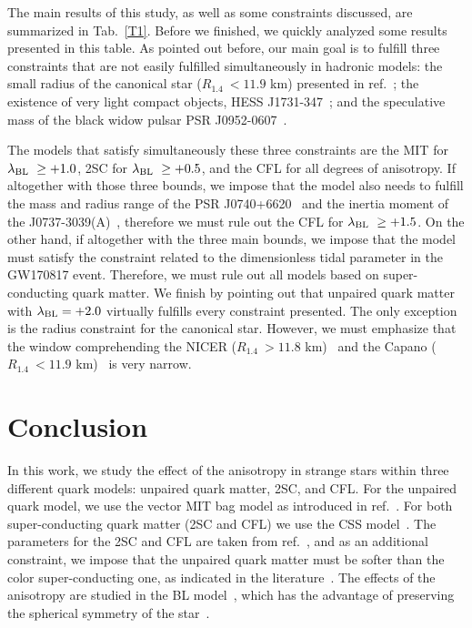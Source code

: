 \documentclass[%
reprint,
superscriptaddress,
nofootinbib,
amsmath,
amssymb,
aps,
floatfix,
showkeys,
]{revtex4-2}
\begin{document}
The main results of this study, as well as some constraints discussed, are summarized in Tab.~\ref{T1}.
Before we finished, we quickly analyzed some results presented in this table. As pointed out before, our main goal is to fulfill three constraints that are not easily fulfilled simultaneously in hadronic models: the small radius of the canonical star ($R_{1.4}~< 11.9$ km) presented in ref.~\cite{Capano_2020}; the existence of very light compact objects, HESS J1731-347~\cite{Doroshenko_2022}; and the speculative mass of the black widow pulsar PSR J0952-0607~\cite{Romani_2022}.

The models that satisfy simultaneously these three constraints are the MIT for $\lambda_{\rm BL}~\geq +1.0$, 2SC for $\lambda_{\rm BL}~\geq +0.5$, and the CFL for all degrees of anisotropy. If altogether with those three bounds, we impose that the model also needs to fulfill the mass and radius range of the PSR J0740+6620~\cite{Miller_2021} and the inertia moment of the J0737-3039(A)~\cite{Landry_2018}, therefore we must rule out the CFL for $\lambda_{\rm BL}~\geq +1.5$.
On the other hand, if altogether with the three main bounds, we impose that the model must satisfy the constraint related to the dimensionless tidal parameter in the GW170817 event. Therefore, we must rule out all models based on super-conducting quark matter. We finish by pointing out that unpaired quark matter with $\lambda_{\rm BL} = +2.0$ virtually fulfills every constraint presented. The only exception is the radius constraint for the canonical star. However, we must emphasize that the window comprehending the NICER ($R_{1.4}~>11.8$ km)~\cite{Miller_2021} and the Capano ($R_{1.4}~< 11.9$ km)~\cite{Capano_2020} is very narrow.
\section{Conclusion}
In this work, we study the effect of the anisotropy in strange stars within three different quark models: unpaired quark matter, 2SC, and CFL. For the unpaired quark model, we use the vector MIT bag model as introduced in ref.~\cite{Lopes_2021, Lopes_2021b}. For both super-conducting quark matter (2SC and CFL) we use the CSS model~\cite{Zdunik2013, Alford2015, Burgio2016, Alford2013, Han2019, Cierniak_2020, Sun2023, Lopes2023JCAP}. The parameters for the 2SC and CFL are taken from ref.~\cite{Zdunik2013}, and as an additional constraint, we impose that the unpaired quark matter must be softer than the color super-conducting one, as indicated in the literature~\cite{Alford2008, Lugones2004}. The effects of the anisotropy are studied in the BL model~\cite{Bowers_1974}, which has the advantage of preserving the spherical symmetry of the star~\cite{DelgadoeDelgado2018}.
\end{document}
